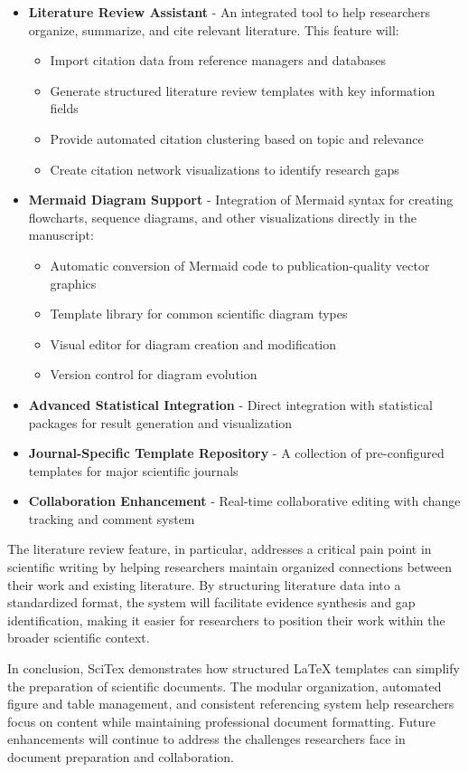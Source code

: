 \begin{itemize}
    \item \textbf{Literature Review Assistant} - An integrated tool to help researchers organize, summarize, and cite relevant literature. This feature will:
    \begin{itemize}
        \item Import citation data from reference managers and databases
        \item Generate structured literature review templates with key information fields
        \item Provide automated citation clustering based on topic and relevance
        \item Create citation network visualizations to identify research gaps
    \end{itemize}
    
    \item \textbf{Mermaid Diagram Support} - Integration of Mermaid syntax for creating flowcharts, sequence diagrams, and other visualizations directly in the manuscript:
    \begin{itemize}
        \item Automatic conversion of Mermaid code to publication-quality vector graphics
        \item Template library for common scientific diagram types
        \item Visual editor for diagram creation and modification
        \item Version control for diagram evolution
    \end{itemize}
    
    \item \textbf{Advanced Statistical Integration} - Direct integration with statistical packages for result generation and visualization
    
    \item \textbf{Journal-Specific Template Repository} - A collection of pre-configured templates for major scientific journals
    
    \item \textbf{Collaboration Enhancement} - Real-time collaborative editing with change tracking and comment system
\end{itemize}

The literature review feature, in particular, addresses a critical pain point in scientific writing by helping researchers maintain organized connections between their work and existing literature. By structuring literature data into a standardized format, the system will facilitate evidence synthesis and gap identification, making it easier for researchers to position their work within the broader scientific context.

In conclusion, SciTex demonstrates how structured LaTeX templates can simplify the preparation of scientific documents. The modular organization, automated figure and table management, and consistent referencing system help researchers focus on content while maintaining professional document formatting. Future enhancements will continue to address the challenges researchers face in document preparation and collaboration.

